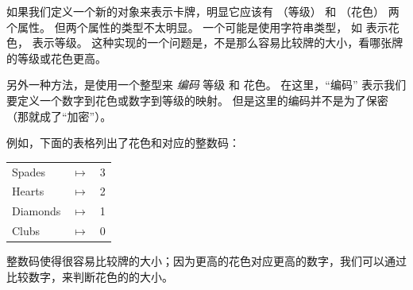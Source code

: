   


如果我们定义一个新的对象来表示卡牌，明显它应该有  （等级） 和  （花色）
两个属性。  但两个属性的类型不太明显。  一个可能是使用字符串类型，
如  表示花色， 表示等级。  这种实现的一个问题是，不是那么容易比较牌的大小，看哪张牌的等级或花色更高。

  
  


另外一种方法，是使用一个整型来 {\em 编码} 等级 和 花色。
在这里，``编码'' 表示我们要定义一个数字到花色或数字到等级的映射。
但是这里的编码并不是为了保密（那就成了``加密''）。

\newcommand{\mymapsto}{$\mapsto$}


例如，下面的表格列出了花色和对应的整数码：

\begin{tabular}{l c l}
Spades & \mymapsto & 3 \\
Hearts & \mymapsto & 2 \\
Diamonds & \mymapsto & 1 \\
Clubs & \mymapsto & 0
\end{tabular}


整数码使得很容易比较牌的大小；因为更高的花色对应更高的数字，我们可以通过比较数字，来判断花色的的大小。


